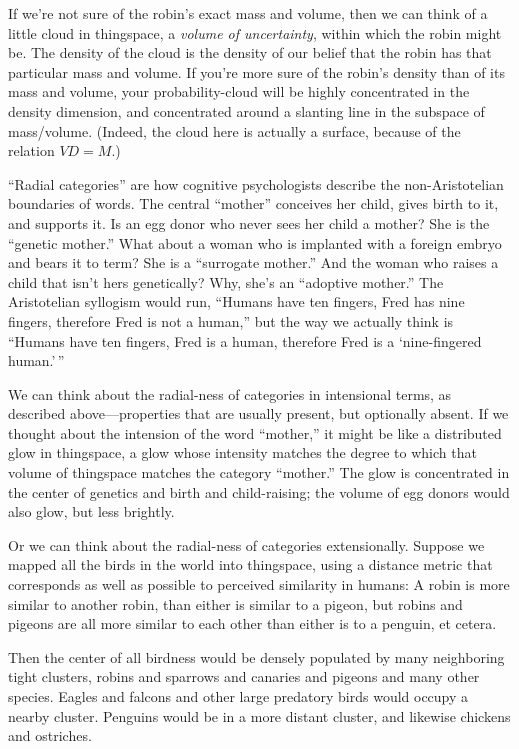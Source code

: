 {{{
 If we're not sure of the robin's
exact mass and volume, then we can think of a little cloud in
thingspace, a \textit{volume of uncertainty}, within which the robin
might be. The density of the cloud is the density of our belief that
the robin has that particular mass and volume. If
you're more sure of the robin's density
than of its mass and volume, your probability-cloud will be highly
concentrated in the density dimension, and concentrated around a
slanting line in the subspace of mass/volume. (Indeed, the cloud here
is actually a surface, because of the relation $V D = M$.)}

{
 ``Radial categories'' are how
cognitive psychologists describe the non-Aristotelian boundaries of
words. The central ``mother''
conceives her child, gives birth to it, and supports it. Is an egg
donor who never sees her child a mother? She is the
``genetic mother.'' What about a
woman who is implanted with a foreign embryo and bears it to term? She
is a ``surrogate mother.'' And the
woman who raises a child that isn't hers genetically?
Why, she's an ``adoptive
mother.'' The Aristotelian syllogism would run,
``Humans have ten fingers, Fred has nine fingers,
therefore Fred is not a human,'' but the way we
actually think is ``Humans have ten fingers, Fred is a
human, therefore Fred is a `nine-fingered
human.'\,''}

{
 We can think about the radial-ness of categories in intensional
terms, as described above---properties that are usually present, but
optionally absent. If we thought about the intension of the word
``mother,'' it might be like a
distributed glow in thingspace, a glow whose intensity matches the
degree to which that volume of thingspace matches the category
``mother.'' The glow is concentrated
in the center of genetics and birth and child-raising; the volume of
egg donors would also glow, but less brightly.}

{
 Or we can think about the radial-ness of categories extensionally.
Suppose we mapped all the birds in the world into thingspace, using a
distance metric that corresponds as well as possible to perceived
similarity in humans: A robin is more similar to another robin, than
either is similar to a pigeon, but robins and pigeons are all more
similar to each other than either is to a penguin, et cetera.}

{
 Then the center of all birdness would be densely populated by many
neighboring tight clusters, robins and sparrows and canaries and
pigeons and many other species. Eagles and falcons and other large
predatory birds would occupy a nearby cluster. Penguins would be in a
more distant cluster, and likewise chickens and ostriches.}

}}
